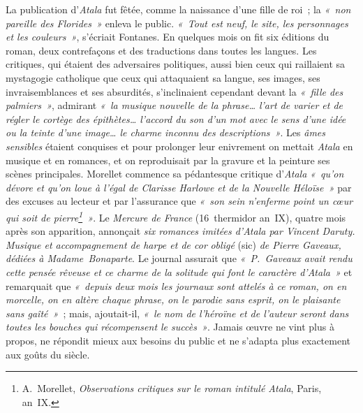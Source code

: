 \documentclass[french,twoside]{book} %
\begin{document}
La publication d’\emph{Atala} fut fêtée, comme la naissance d’une fille de roi ; la \emph{« non pareille des Florides »} enleva le public. \emph{« Tout est neuf, le site, les personnages et les couleurs »}, s’écriait Fontanes. En quelques mois on fit six éditions du roman, deux contrefaçons et des traductions dans toutes les langues. Les critiques, qui étaient des adversaires politiques, aussi bien ceux qui raillaient sa mystagogie catholique que ceux qui attaquaient sa langue, ses images, ses invraisemblances et ses absurdités, s’inclinaient cependant devant la \emph{« fille des palmiers »}, admirant \emph{« la musique nouvelle de la phrase… l’art de varier et de régler le cortège des épithètes… l’accord du son d’un mot avec le sens d’une idée ou la teinte d’une image… le charme inconnu des descriptions »}. Les {\itshape âmes sensibles} étaient conquises et pour prolonger leur enivrement on mettait \emph{Atala} en musique et en romances, et on reproduisait par la gravure et la peinture ses scènes principales. Morellet commence sa pédantesque critique d’\emph{Atala} \emph{« qu’on dévore et qu’on loue à l’égal de \emph{Clarisse Harlowe} et de la \emph{Nouvelle Héloïse} »} par des excuses au lecteur et par l’assurance que \emph{« son sein n’enferme point un cœur qui soit de pierre\footnote{A. Morellet, \emph{Observations critiques sur le roman intitulé Atala}, Paris, an IX.} »}. Le \emph{Mercure de France} (16 thermidor an IX), quatre mois après son apparition, annonçait \emph{six romances imitées d’Atala par Vincent Daruty}{\itshape . Musique et accompagnement de harpe et de cor}  
\label{p579}{\itshape obligé} (sic) {\itshape de Pierre Gaveaux, dédiées à Madame Bonaparte}. Le journal assurait que \emph{« P. Gaveaux avait rendu cette pensée rêveuse et ce charme de la solitude qui font le caractère d’\emph{Atala} »} et remarquait que \emph{« depuis deux mois les journaux sont attelés à ce roman, on en morcelle, on en altère chaque phrase, on le parodie sans esprit, on le plaisante sans gaîté »} ; mais, ajoutait-il, \emph{« le nom de l’héroïne et de l’auteur seront dans toutes les bouches qui récompensent le succès »}. Jamais œuvre ne vint plus à propos, ne répondit mieux aux besoins du public et ne s’adapta plus exactement aux goûts du siècle.\par
\end{document}
